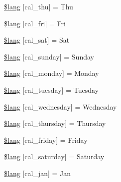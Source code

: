 \begin{DoxyCompactItemize}
\item 
\hyperlink{calendar__lang_8php_af49921f5f0bcc54c07efed2cf4b71e01}{\$lang} \mbox{[}\textquotesingle{}cal\+\_\+thu\textquotesingle{}\mbox{]} = \textquotesingle{}Thu\textquotesingle{}
\item 
\hyperlink{calendar__lang_8php_abfe2cd9d203b296392f657caf8488b53}{\$lang} \mbox{[}\textquotesingle{}cal\+\_\+fri\textquotesingle{}\mbox{]} = \textquotesingle{}Fri\textquotesingle{}
\item 
\hyperlink{calendar__lang_8php_aa1dc0204b4066fa35b0760e1437e8194}{\$lang} \mbox{[}\textquotesingle{}cal\+\_\+sat\textquotesingle{}\mbox{]} = \textquotesingle{}Sat\textquotesingle{}
\item 
\hyperlink{calendar__lang_8php_ade346ced9dfd91f19b1912bda55ed6b9}{\$lang} \mbox{[}\textquotesingle{}cal\+\_\+sunday\textquotesingle{}\mbox{]} = \textquotesingle{}Sunday\textquotesingle{}
\item 
\hyperlink{calendar__lang_8php_a55fb324dcfcabd69cc212d116b6b0254}{\$lang} \mbox{[}\textquotesingle{}cal\+\_\+monday\textquotesingle{}\mbox{]} = \textquotesingle{}Monday\textquotesingle{}
\item 
\hyperlink{calendar__lang_8php_a2f395fc42eea1e44a77e77525b266061}{\$lang} \mbox{[}\textquotesingle{}cal\+\_\+tuesday\textquotesingle{}\mbox{]} = \textquotesingle{}Tuesday\textquotesingle{}
\item 
\hyperlink{calendar__lang_8php_a85c82aef005144770cf7356945a85819}{\$lang} \mbox{[}\textquotesingle{}cal\+\_\+wednesday\textquotesingle{}\mbox{]} = \textquotesingle{}Wednesday\textquotesingle{}
\item 
\hyperlink{calendar__lang_8php_a3ab3ea291fddc8063b57a25cfbc7cf0f}{\$lang} \mbox{[}\textquotesingle{}cal\+\_\+thursday\textquotesingle{}\mbox{]} = \textquotesingle{}Thursday\textquotesingle{}
\item 
\hyperlink{calendar__lang_8php_a5be751a9260fe00120263d6e1f41de8c}{\$lang} \mbox{[}\textquotesingle{}cal\+\_\+friday\textquotesingle{}\mbox{]} = \textquotesingle{}Friday\textquotesingle{}
\item 
\hyperlink{calendar__lang_8php_aff3fc79a60ccf1f09bfe1f4387105c4b}{\$lang} \mbox{[}\textquotesingle{}cal\+\_\+saturday\textquotesingle{}\mbox{]} = \textquotesingle{}Saturday\textquotesingle{}
\item 
\hyperlink{calendar__lang_8php_a830b34d4425cdab2632056ef2860de62}{\$lang} \mbox{[}\textquotesingle{}cal\+\_\+jan\textquotesingle{}\mbox{]} = \textquotesingle{}Jan\textquotesingle{}
\item 

\end{DoxyCompactItemize}
